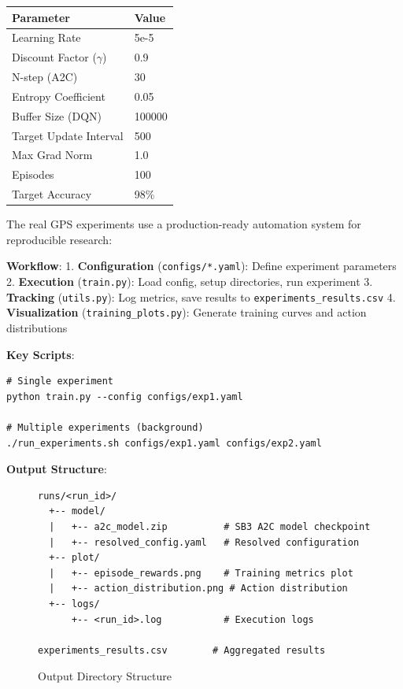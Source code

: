\begin{tabular}{|l|l|}
	\hline
	\textbf{Parameter}     & \textbf{Value} \\
	\hline
	Learning Rate          & 5e-5           \\
	\hline
	Discount Factor ($\gamma$)    & 0.9            \\
	\hline
	N-step (A2C)           & 30             \\
	\hline
	Entropy Coefficient    & 0.05           \\
	\hline
	Buffer Size (DQN)      & 100000         \\
	\hline
	Target Update Interval & 500            \\
	\hline
	Max Grad Norm          & 1.0            \\
	\hline
	Episodes               & 100            \\
	\hline
	Target Accuracy        & 98\%           \\
	\hline
\end{tabular}

The real GPS experiments use a production-ready automation system for
reproducible research:

\textbf{Workflow}:
1. \textbf{Configuration} (\texttt{configs/*.yaml}): Define experiment parameters
2. \textbf{Execution} (\texttt{train.py}): Load config, setup directories, run experiment
3. \textbf{Tracking} (\texttt{utils.py}): Log metrics, save results to \texttt{experiments\_results.csv}
4. \textbf{Visualization} (\texttt{training\_plots.py}): Generate training curves and action distributions

\textbf{Key Scripts}:

\begin{verbatim}
# Single experiment
python train.py --config configs/exp1.yaml

# Multiple experiments (background)
./run_experiments.sh configs/exp1.yaml configs/exp2.yaml
\end{verbatim}

\textbf{Output Structure}:

\begin{figure}[t]
	\centering
	\caption{Output Directory Structure}
	\label{output-structure}
	\small
	\begin{verbatim}
runs/<run_id>/
  +-- model/
  |   +-- a2c_model.zip          # SB3 A2C model checkpoint
  |   +-- resolved_config.yaml   # Resolved configuration
  +-- plot/
  |   +-- episode_rewards.png    # Training metrics plot
  |   +-- action_distribution.png # Action distribution
  +-- logs/
      +-- <run_id>.log           # Execution logs

experiments_results.csv        # Aggregated results
	\end{verbatim}
\end{figure}


